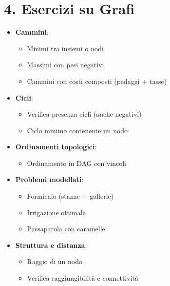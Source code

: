 \documentclass[a4paper,12pt]{article}
\begin{document}
\vspace{1em}
\section*{4. Esercizi su Grafi}

\begin{itemize}[itemsep=0.3em]
  \item \textbf{Cammini}:
  \begin{itemize}
    \item Minimi tra insiemi o nodi
    \item Massimi con pesi negativi
    \item Cammini con costi composti (pedaggi + tasse)
  \end{itemize}
  \item \textbf{Cicli}:
  \begin{itemize}
    \item Verifica presenza cicli (anche negativi)
    \item Ciclo minimo contenente un nodo
  \end{itemize}
  \item \textbf{Ordinamenti topologici}:
  \begin{itemize}
    \item Ordinamento in DAG con vincoli
  \end{itemize}
  \item \textbf{Problemi modellati}:
  \begin{itemize}
    \item Formicaio (stanze + gallerie)
    \item Irrigazione ottimale
    \item Passaparola con caramelle
  \end{itemize}
  \item \textbf{Struttura e distanza}:
  \begin{itemize}
    \item Raggio di un nodo
    \item Verifica raggiungibilità e connettività
  \end{itemize}
\end{itemize}
\end{document}
